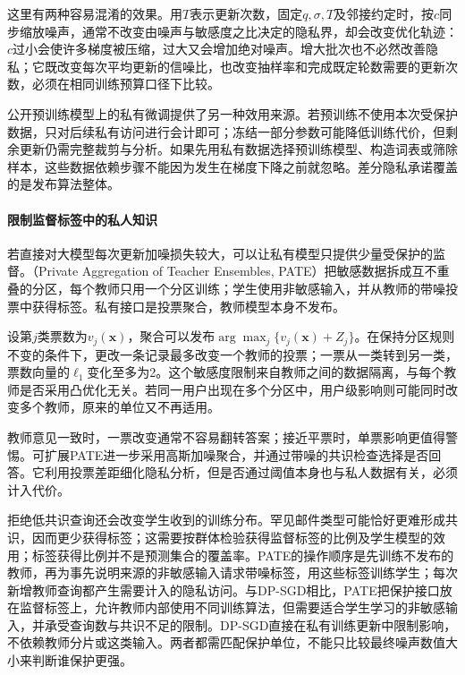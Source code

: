 这里有两种容易混淆的效果。用$T$表示更新次数，固定$q,\sigma,T$及邻接约定时，按$c$同步缩放噪声，通常不改变由噪声与敏感度之比决定的隐私界，却会改变优化轨迹：$c$过小会使许多梯度被压缩，过大又会增加绝对噪声。增大批次也不必然改善隐私；它既改变每次平均更新的信噪比，也改变抽样率和完成既定轮数需要的更新次数，必须在相同训练预算口径下比较。

公开预训练模型上的私有微调提供了另一种效用来源。若预训练不使用本次受保护数据，只对后续私有访问进行会计即可；冻结一部分参数可能降低训练代价，但剩余更新仍需完整裁剪与分析。如果先用私有数据选择预训练模型、构造词表或筛除样本，这些数据依赖步骤不能因为发生在梯度下降之前就忽略。差分隐私承诺覆盖的是发布算法整体。

\paragraph{限制监督标签中的私人知识}

若直接对大模型每次更新加噪损失较大，可以让私有模型只提供少量受保护的监督。（Private Aggregation of Teacher Ensembles, PATE）把敏感数据拆成互不重叠的分区，每个教师只用一个分区训练；学生使用非敏感输入，并从教师的带噪投票中获得标签。私有接口是投票聚合，教师模型本身不发布。

设第$j$类票数为$v_j(\bm x)$，聚合可以发布$\arg\max_j\{v_j(\bm x)+Z_j\}$。在保持分区规则不变的条件下，更改一条记录最多改变一个教师的投票；一票从一类转到另一类，票数向量的$\ell_1$变化至多为2。这个敏感度限制来自教师之间的数据隔离，与每个教师是否采用凸优化无关。若同一用户出现在多个分区中，用户级影响则可能同时改变多个教师，原来的单位又不再适用。

教师意见一致时，一票改变通常不容易翻转答案；接近平票时，单票影响更值得警惕。可扩展PATE进一步采用高斯加噪聚合，并通过带噪的共识检查选择是否回答。它利用投票差距细化隐私分析，但是否通过阈值本身也与私人数据有关，必须计入代价。

拒绝低共识查询还会改变学生收到的训练分布。罕见邮件类型可能恰好更难形成共识，因而更少获得标签；这需要按群体检验获得监督标签的比例及学生模型的效用；标签获得比例并不是预测集合的覆盖率。PATE的操作顺序是先训练不发布的教师，再为事先说明来源的非敏感输入请求带噪标签，用这些标签训练学生；每次新增教师查询都产生需要计入的隐私访问。与DP-SGD相比，PATE把保护接口放在监督标签上，允许教师内部使用不同训练算法，但需要适合学生学习的非敏感输入，并承受查询数与共识不足的限制。DP-SGD直接在私有训练更新中限制影响，不依赖教师分片或这类输入。两者都需匹配保护单位，不能只比较最终噪声数值大小来判断谁保护更强。

